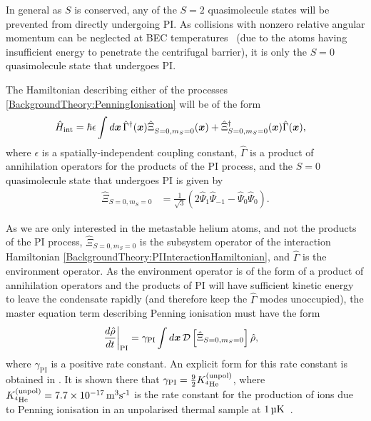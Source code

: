 In general as $S$ is conserved, any of the $S=2$ quasimolecule states will be prevented from directly undergoing PI. As collisions with nonzero relative angular momentum can be neglected at BEC temperatures~\citep{Venturi:2000,Stas:2006kx} (due to the atoms having insufficient energy to penetrate the centrifugal barrier), it is only the $S=0$ quasimolecule state that undergoes PI.

The Hamiltonian describing either of the processes \eqref{BackgroundTheory:PenningIonisation} will be of the form
\begin{align}
    \hat{H}_\text{int} &= \hbar \epsilon \int d \vect{x}\, \hat{\Gamma}^\dagger(\vect{x})\hat{\Xi}_{S=0, m_S=0}^{\phantom{\dagger}}(\vect{x}) + \hat{\Xi}_{S=0, m_S=0}^\dagger (\vect{x}) \hat{\Gamma}(\vect{x}), \label{BackgroundTheory:PIInteractionHamiltonian}
\end{align}
where $\epsilon$ is a spatially-independent coupling constant, $\hat{\Gamma}$ is a product of annihilation operators for the products of the PI process, and the $S=0$ quasimolecule state that undergoes PI is given by
\begin{align}
    \hat{\Xi}_{S=0, m_S=0} &= \frac{1}{\sqrt{3}} \left( 2 \hat{\Psi}_1 \hat{\Psi}_{-1} - \hat{\Psi}_0 \hat{\Psi}_0\right).
\end{align}

As we are only interested in the metastable helium atoms, and not the products of the PI process, $\hat{\Xi}_{S=0, m_S=0}$ is the subsystem operator of the interaction Hamiltonian \eqref{BackgroundTheory:PIInteractionHamiltonian}, and $\hat{\Gamma}$ is the environment operator.  As the environment operator is of the form of a product of annihilation operators and the products of PI will have sufficient kinetic energy to leave the condensate rapidly (and therefore keep the $\hat{\Gamma}$ modes unoccupied), the master equation term describing Penning ionisation must have the form
\begin{align}
    \left.\frac{d \hat{\rho}}{dt}\right|_\text{PI} &= \gamma_\text{PI} \int d \vect{x}\, \mathcal{D}\left[ \hat{\Xi}_{S=0, m_S=0}\right] \hat{\rho}, \label{BackgroundTheory:PenningIonisationMasterEquationTerm}
\end{align}
where $\gamma_\text{PI}$ is a positive rate constant.  An explicit form for this rate constant is obtained in .  It is shown there that $\gamma_\text{PI} = \frac{9}{2} K^\text{(unpol)}_{^4\text{He}}$, where $\Kunpol = \unit[7.7\times 10^{-17}]{m\textsuperscript{3}s\textsuperscript{-1}}$ is the rate constant for the production of ions due to Penning ionisation in an unpolarised thermal sample at $\unit[1]{\micro K}$~\citep{Stas:2006kx}.

